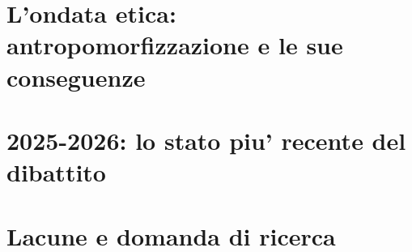 \section{L'ondata etica: antropomorfizzazione e le sue conseguenze}
\label{sec:evo-etica}

\section{2025-2026: lo stato piu' recente del dibattito}
\label{sec:evo-recente}

\section{Lacune e domanda di ricerca}
\label{sec:gap}

